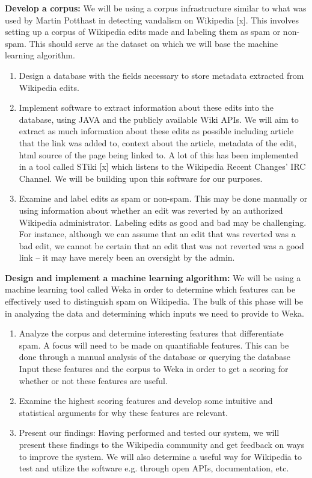 \documentclass[letterpaper]{sig-alternate}
\begin{document}
\textbf{Develop a corpus:} We will be using a corpus infrastructure similar to what was used by Martin Potthast in detecting vandalism on Wikipedia [x]. This involves setting up a corpus of Wikipedia edits made and labeling them as spam or non-spam. This should serve as the dataset on which we will base the machine learning algorithm. 
\begin{enumerate}
\item Design a database with the fields necessary to store metadata extracted from Wikipedia edits. 
\item Implement software to extract information about these edits into the database, using JAVA and the publicly available Wiki APIs. We will aim to extract as much information about these edits as possible including article that the link was added to, context about the article, metadata of the edit, html source of the page being linked to. A lot of this has been implemented in a tool called STiki [x] which listens to the Wikipedia Recent Changes’ IRC Channel. We will be building upon this software for our purposes.
\item Examine and label edits as spam or non-spam. This may be done manually or using information about whether an edit was reverted by an authorized Wikipedia administrator. Labeling edits as good and bad may be challenging. For instance, although we can assume that an edit that was reverted was a bad edit, we cannot be certain that an edit that was not reverted was a good link – it may have merely been an oversight by the admin.
\end{enumerate}

\textbf{Design and implement a machine learning algorithm:} We will be using a machine learning tool called Weka in order to determine which features can be effectively used to distinguish spam on Wikipedia. The bulk of this phase will be in analyzing the data and determining which inputs we need to provide to Weka.
\begin{enumerate}
\item Analyze the corpus and determine interesting features that differentiate spam. A focus will need to be made on quantifiable features. This can be done through a manual analysis of the database or querying the database
Input these features and the corpus to Weka in order to get a scoring for whether or not these features are useful. 
\item Examine the highest scoring features and develop some intuitive and statistical arguments for why these features are relevant.
\item Present our findings: Having performed and tested our system, we will present these findings to the Wikipedia community and get feedback on ways to improve the system. We will also determine a useful way for Wikipedia to test and utilize the software e.g. through open APIs, documentation, etc.
\end{enumerate}
\end{document}
